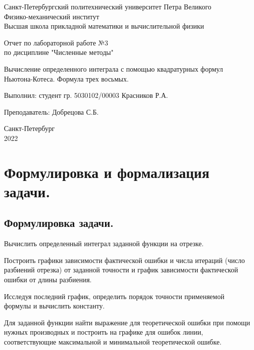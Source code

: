 \documentclass[a4paper, 12pt]{article}
\begin{document}
	\begin{titlepage}
		\begin{center}
			Санкт-Петербургский политехнический университет Петра Великого \\ Физико-механический институт \\ Высшая школа прикладной математики и вычислительной физики
		\end{center}
		\vspace{10em}
		\begin{center}
			\Large Отчет по лабораторной работе №3 \\ по дисциплине "Численные методы"
		\end{center}
		\vspace{1em}
		\begin{center}
			\Huge Вычисление определенного интеграла с помощью квадратурных формул Ньютона-Котеса. Формула трех восьмых.
		\end{center}
		\vspace{15em}
		{\Large 
			
			Выполнил: студент гр. 5030102/00003 Красников Р.А.
			\vspace{1em}
			
			Преподаватель: Добрецова С.Б.}
		\vspace{\fill}
		\begin{center}
			Санкт-Петербург \\ 2022
		\end{center}
	\end{titlepage}
	\newpage
	
	\section{Формулировка и формализация задачи.}
	
	\subsection{Формулировка задачи.}
	
	Вычислить определенный интеграл заданной функции на отрезке.
	
	Построить графики зависимости фактической ошибки и числа итераций (число разбиений отрезка) от заданной точности и график зависимости фактической ошибки от длины разбиения.
	
	Исследуя последний график, определить порядок точности применяемой формулы и вычислить константу.
	
	Для заданной функции найти выражение для теоретической ошибки при помощи нужных производных и построить на графике для ошибок линии, соответствующие максимальной и минимальной теоретической ошибке.
	
\end{document}
